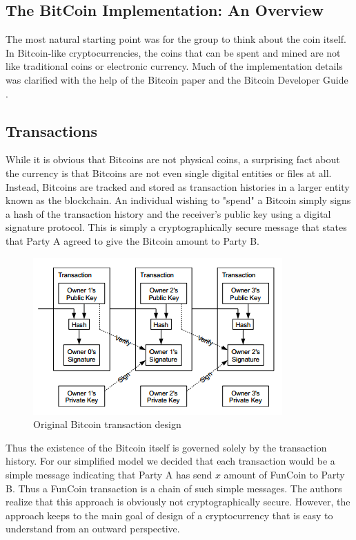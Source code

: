 \documentclass[12pt]{article}
\begin{document}
\subsection{The BitCoin Implementation: An Overview}
The most natural starting point was for the group to think about the coin itself.
In Bitcoin-like cryptocurrencies, the coins that can be spent and mined are not
like traditional coins or electronic currency. Much of the implementation details
was clarified with the help of the Bitcoin paper\cite{nakamoto:bitcoin} and the
Bitcoin Developer Guide \cite{dev:guide}. 

\subsection{Transactions}
While it is obvious that Bitcoins are not physical coins, a surprising fact about
the currency is that Bitcoins are not even single digital entities or files at all.
Instead, Bitcoins are tracked and stored as transaction histories in a larger entity
known as the blockchain. An individual wishing to "spend" a Bitcoin simply signs
a hash of the transaction history and the receiver's public key using a digital signature
protocol. This is simply a cryptographically secure message that states that Party A agreed
to give the Bitcoin amount to Party B.

\begin{figure}[h!]
  \centering
  \includegraphics[scale=1]{transaction.png}
  \caption{Original Bitcoin transaction design \cite{nakamoto:bitcoin}}
\end{figure}

Thus the existence of the Bitcoin itself is governed solely by the transaction history. For our
simplified model we decided that each transaction would be a simple message indicating that Party
A has send $x$ amount of FunCoin to Party B. Thus a FunCoin transaction is a chain of such simple
messages. The authors realize that this approach is obviously not cryptographically secure. However,
the approach keeps to the main goal of design of a cryptocurrency that is easy to understand from an
outward perspective.
\end{document}
